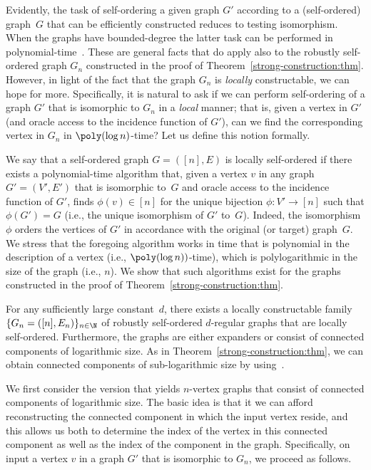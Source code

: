 Evidently, the task of self-ordering a given graph $G'$
according to a (self-ordered) graph~$G$ that can
be efficiently constructed reduces to testing isomorphism.
When the graphs have bounded-degree the latter task
can be performed in polynomial-time~\cite{L}.
%
These are general facts that do apply also to
the robustly self-ordered graph $G_n$ constructed
in the proof of Theorem~\ref{strong-construction:thm}.
However, in light of the fact that the graph $G_n$
is {\em locally}\/ constructable, we can hope for more.
Specifically, it is natural to ask if we can perform
self-ordering of a graph $G'$ that is isomorphic to $G_n$
in a {\em local}\/ manner; that is, given a vertex in $G'$
(and oracle access to the incidence function of $G'$),
can we find the corresponding vertex in $G_n$ in $\poly(\log n)$-time?
Let us define this notion formally.
%
%
%
%
%


%
\label{local-so:def}
We say that a self-ordered graph $G=([n],E)$
is {\sf locally self-ordered}
if there exists a polynomial-time algorithm that,
given a vertex $v$ in any graph $G'=(V',E')$ that is isomorphic to~$G$
and oracle access to the incidence function of $G'$,
finds $\phi(v)\in[n]$ for the unique bijection  $\phi:V'\to[n]$
such that $\phi(G')=G$
{\rm(i.e., the unique isomorphism of $G'$ to~$G$)}.
\ED
Indeed, the isomorphism $\phi$ orders the vertices of $G'$
in accordance with the original (or target) graph~$G$.
We stress that the foregoing algorithm works in time that is polynomial
in the description of a vertex (i.e., $\poly(\log n))$-time),
which is polylogarithmic in the size of the graph (i.e., $n$).
%
We show that such algorithms exist for the graphs constructed
in the proof of Theorem~\ref{strong-construction:thm}.

%
%
\label{local-so4strong-construction:thm}
For any sufficiently large constant~$d$, there exists
a locally constructable family $\{G_n=([n],E_n)\}_{n\in\N}$
of robustly self-ordered $d$-regular graphs
that are locally self-ordered.
%
%
%
Furthermore, the graphs are either expanders
or consist of connected components of logarithmic size.
\ET
As in Theorem~\ref{strong-construction:thm},
we can obtain connected components of sub-logarithmic size
by using~\cite{GW:perm}.
\medskip

\BPF
We first consider the version that yields $n$-vertex graphs
that consist of connected components of logarithmic size.
The basic idea is that it we can afford reconstructing
the connected component in which the input vertex reside,
and this allows us both to determine the index of the vertex
in this connected component as well as the index of the component
in the graph. Specifically,
on input a vertex $v$ in a graph $G'$ that is isomorphic to $G_n$,
we proceed as follows.

